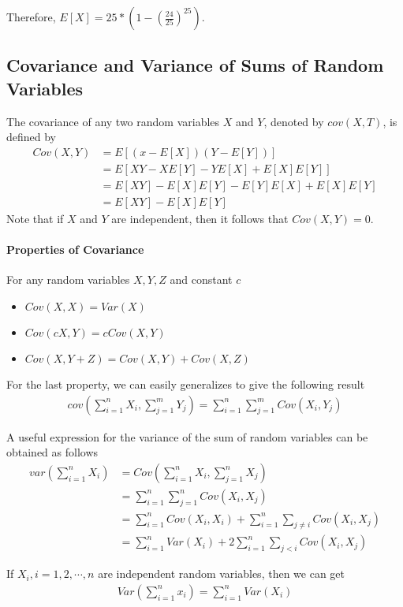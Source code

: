 \documentclass[10 pt,final]{article}
\newcommand{\impo}[1]{{\color{magenta} #1}}
\begin{document}
Therefore, $E[X] = 25*(1-(\frac{24}{25})^25)$.


\subsection{Covariance and Variance of Sums of Random Variables}
The covariance of any two random variables $X$ and $Y$, denoted by $cov(X,T)$, is defined by
\begin{align*}
Cov(X,Y) & = E[(x-E[X])(Y-E[Y])] \\
& = E[XY - XE[Y] - YE[X] + E[X]E[Y]] \\
& = E[XY] -E[X]E[Y] - E[Y]E[X] + E[X]E[Y] \\
& = E[XY] - E[X]E[Y]
\end{align*}
Note that if $X$ and $Y$ are \impo{independent}, then it follows that \impo{$Cov(X,Y) = 0$}.

\paragraph{Properties of Covariance} For any random variables $X, Y, 
Z$ and constant $c$
\begin{itemize}
\item $Cov(X,X) = Var(X)$
\item $Cov(cX,Y) = cCov(X,Y)$
\item $Cov(X,Y+Z) = Cov(X,Y) + Cov(X,Z)$
\end{itemize}

For the last property, we can easily generalizes to give the following result
\impo{
\begin{align*}
cov(\sum^n_{i=1} X_i, \sum^m_{j=1} Y_j) = \sum^n_{i=1} \sum^m_{j=1} Cov(X_i, Y_j)
\end{align*}}

A useful expression for the variance of the sum of random variables can be obtained as follows
\begin{align*}
var(\sum^n_{i=1} X_i) & = Cov(\sum^n_{i=1} X_i, \sum^n_{j=1} X_j) \\
& = \sum^n_{i=1} \sum^n_{j=1} Cov(X_i, X_j) \\
& = \sum^n_{i=1} Cov(X_i,X_i) + \sum^n_{i=1} \sum_{j \neq i} Cov(X_i, X_j) \\
& = \sum^n_{i=1} Var(X_i) + 2 \sum^n_{i=1} \sum_{j < i} Cov(X_i, X_j)
\end{align*}

If $X_i, i=1,2, \cdots, n$ are independent random variables, then we can get
\begin{align*}
Var(\sum^n_{i=1} x_i) = \sum^n_{i=1} Var(X_i)
\end{align*}
\end{document}
